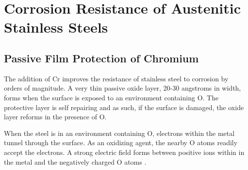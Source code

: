



\FloatBarrier







\section[Corrosion Resistance]{Corrosion Resistance of Austenitic Stainless Steels}

\subsection{Passive Film Protection of Chromium}

The addition of Cr improves the resistance of stainless steel to corrosion by orders of magnitude.  A very thin passive oxide layer, 20-30 angstroms in width, forms when the surface is exposed to an environment containing \Gls{O}.  The protective layer is self repairing and as such, if the surface is damaged, the oxide layer reforms in the presence of \Gls{O}.

When the steel is in an environment containing \Gls{O}, electrons within the metal tunnel through the surface.  As an oxidizing agent, the nearby \Gls{O} atoms readily accept the electrons.  A strong electric field forms between positive ions within in the metal and the negatively charged \Gls{O} atoms \cite{medicalmetals133}.  

